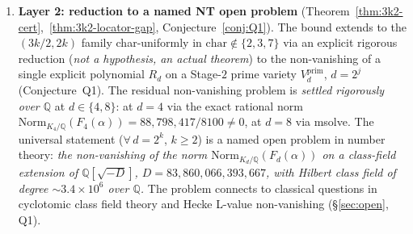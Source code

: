 \documentclass[11pt]{article}
\theoremstyle{definition}
\theoremstyle{remark}
\begin{document}
\begin{enumerate}[label=(\arabic*),leftmargin=1.5em]
\item \textbf{Layer 2: reduction to a named NT open problem}
(Theorem~\ref{thm:3k2-cert},~\ref{thm:3k2-locator-gap},
Conjecture~\ref{conj:Q1}). The bound extends to the
$(3k/2, 2k)$ family char-uniformly in
$\mathrm{char} \notin \{2, 3, 7\}$ via an explicit rigorous
reduction (\emph{not a hypothesis, an actual theorem}) to the
non-vanishing of a single explicit polynomial $R_d$ on a
Stage-$2$ prime variety $V_d^{\mathrm{prim}}$, $d = 2^j$
(Conjecture~Q1). The residual non-vanishing problem is
\emph{settled rigorously over $\mathbb{Q}$} at $d \in \{4, 8\}$:
at $d = 4$ via the exact rational norm
$\mathrm{Norm}_{K_4/\mathbb{Q}}(F_4(\alpha)) = 88{,}798{,}417/8100 \neq 0$,
at $d = 8$ via msolve. The universal statement
($\forall\, d = 2^k$, $k \geq 2$) is a named open problem in number
theory: \emph{the non-vanishing of the norm
$\mathrm{Norm}_{K_d/\mathbb{Q}}(F_d(\alpha))$ on a class-field
extension of $\mathbb{Q}[\sqrt{-D}]$, $D = 83{,}860{,}066{,}393{,}667$,
with Hilbert class field of degree ${\sim}3.4 \times 10^6$ over
$\mathbb{Q}$.} The problem connects to classical questions in
cyclotomic class field theory and Hecke L-value non-vanishing
(\S\ref{sec:open}, Q1).


\end{enumerate}
\end{document}
